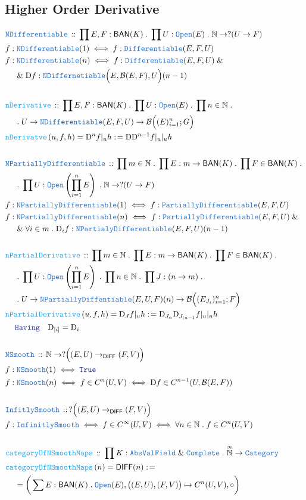 \documentclass[12pt]{scrartcl}
\newcommand{\TYPE}[1]{\textcolor{NavyBlue}{\mathtt{#1}}}
\newcommand{\FUNC}[1]{\textcolor{Cerulean}{\mathtt{#1}}}
\newcommand{\LOGIC}[1]{\textcolor{Blue}{\mathtt{#1}}}
\renewcommand{\.}{\; . \;}
\newcommand{\de}{: \kern 0.1pc =}
\newcommand{\Act}[1]{\left( #1 \right)}
\newcommand{\DeclareType}[2]{& \TYPE{#1} \, :: \, #2 \\}
\newcommand{\DefineNamedType}[4]{& #1 : \TYPE{#2} \iff #3 \iff #4 \\}
\newcommand{\DeclareFunc}[2]{& \FUNC{#1} \, :: \, #2 \\}
\newcommand{\DefineNamedFunc}[4]{&  \FUNC{#1}\Act{#2} = #3 \de #4 \\}
\newcommand{\NewLine}{\\ & \kern 1pc}
\newcommand{\Page}[1]{\begin{align*} #1 \end{align*}   }
\renewcommand{\And}{\; \& \;}
\newcommand{\Nat}{\mathbb{N} }
\newcommand{\Cate}{\TYPE{Category}}
\newcommand{\DIFF}{\mathsf{DIFF}}
\newcommand{\BAN}{\mathsf{BAN}} %
\newcommand{\D}{\mathrm{D}}
\newcommand{\B}{\mathcal{B}}
\begin{document}
\subsection{Higher Order Derivative}
\Page{
	\DeclareType{NDifferentiable}{ \prod E,F : \BAN(K) \.  \prod U : \TYPE{Open}(E) \. \Nat \to ?(U \to F) }
	&  f : \TYPE{NDifferentiable}(1) \iff f : \TYPE{Differentiable}(E,F,U)    \\
	&  f : \TYPE{NDifferentiable}(n) \iff  f : \TYPE{Differentiable}(E,F,U)  \And \NewLine \And \D f : \TYPE{NDiffernetiable}\Big(E, \B(E,F),U\Big)(n -1) \\ 
	\\
	\DeclareFunc{nDerivative}{
		\prod E,F : \BAN(K) \. \prod U : \TYPE{Open}(E) \. \prod n \in \Nat \. 
		\NewLine \.
		U \to \TYPE{NDifferentiable}(E,F,U) \to \B\Big( (E)^n_{i = 1}    ; G\Big) 
	}
	\DefineNamedFunc{nDerivatve}{u,f,h}{ \D^n f |_u h  }{  \D \D^{n-1} f |_u |_u h    }
	\\
	\DeclareType{NPartiallyDifferentiable}{
		\prod m \in \Nat \. \prod E : m \to \BAN(K) \.  \prod F \in \BAN(K) \.
		\NewLine \.
		\prod U : \TYPE{Open}\left( \prod^n_{i = 1} E \right)   \.
		\Nat \to ?(U \to F)
		}
	&  f : \TYPE{NPartiallyDifferentiable}(1) \iff f : \TYPE{PartiallyDifferentiable}(E,F,U) \\
	&  f : \TYPE{NPartiallyDifferentiable}(n) \iff f : \TYPE{PartiallyDifferentiable}(E,F,U) \And \NewLine \And
	\forall i \in m \.  \D_i f : \TYPE{NPartialyDifferentiable}(E,F,U)(n - 1) \\
	\\
	\DeclareFunc{nPartialDerivative}{
		\prod m \in \Nat \. \prod E : m \to \BAN(K) \.  \prod F \in \BAN(K) \.
		\NewLine \.
		\prod U : \TYPE{Open}\left( \prod^n_{i = 1} E \right)   \.
		\prod n \in \Nat \. \prod J : (n \to m) \.
		\NewLine \.
		U  \to  \TYPE{NPartiallyDiffentiable}(E,U,F)(n) \to \B\Big( (E_{J_i})^n_{i = 1} ; F \Big) }
	\DefineNamedFunc{nPartialDerivative}{ u,f,h}{ \D_{J} f |_u h }{ \D_{J_n}\D_{J_{|n-1}}  f |_u |_u h 
		\NewLine \LOGIC{Having} \quad  \D_{ [i]} = \D_i
	}
	\\
	\DeclareType{NSmooth}{ \Nat \to ?\Big( (E,U)  \to_\DIFF (F,V)  \Big)   }
	&  f : \TYPE{NSmooth}(1) \iff \LOGIC{True}  \\
	&  f : \TYPE{NSmooth}(n) \iff f \in C^n(U,V) \iff \D f \in C^{n -1}(U,\B(E,F)) 
	\\ \\
	\DeclareType{InfitlySmooth}{ ?\Big( (E,U) \to_\DIFF (F,V) \Big) }
	\DefineNamedType{f}{InfinitlySmooth}{ f \in C^\infty(U,V) }{ \forall n \in \Nat \. f \in C^n(U,V)  }
	\\
	\DeclareFunc{categoryOfNSmoothMaps}{\prod K : \TYPE{AbsValField} \And \TYPE{Complete} \. \overset{\infty}{\Nat} \to \Cate }
	\DefineNamedFunc{categoryOfNSmoothMaps}{n}{\DIFF(n)}{ \NewLine   =
		\bigg( \sum  E : \BAN(K) \. \TYPE{Open}(E) ,  \big( (E,U),(F,V) \big) \mapsto C^n(U,V), \circ    \bigg)
	}
}
\end{document}
